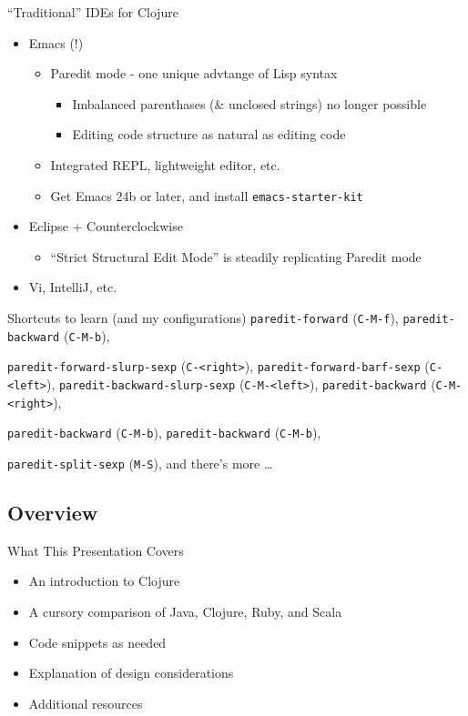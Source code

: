 \documentclass{beamer}
\begin{document}
\begin{frame}[allowframebreaks]{``Traditional'' IDEs for Clojure}
  \begin{itemize}
  \item Emacs (!)
    \begin{itemize}
    \item Paredit mode - one unique advtange of Lisp syntax
      \begin{itemize}
      \item Imbalanced parenthases (\& unclosed strings) no longer possible
      \item Editing code structure as natural as editing code
      \end{itemize}
    \item Integrated REPL, lightweight editor, etc.
    \item Get Emacs 24b or later, and install \texttt{emacs-starter-kit}
    \end{itemize}
  \item Eclipse + Counterclockwise
    \begin{itemize}
    \item ``Strict Structural Edit Mode'' is steadily replicating Paredit mode
    \end{itemize}
  \item Vi, IntelliJ, etc.
  \end{itemize}


\begin{block}{Shortcuts to learn (and my configurations)}
\texttt{paredit-forward} (\texttt{C-M-f}),
\texttt{paredit-backward} (\texttt{C-M-b}),

\texttt{paredit-forward-slurp-sexp} (\texttt{C-<right>}),
\texttt{paredit-forward-barf-sexp} (\texttt{C-<left>}),
\texttt{paredit-backward-slurp-sexp} (\texttt{C-M-<left>}),
\texttt{paredit-backward} (\texttt{C-M-<right>}),

\texttt{paredit-backward} (\texttt{C-M-b}),
\texttt{paredit-backward} (\texttt{C-M-b}),

\texttt{paredit-split-sexp} (\texttt{M-S}),
and there's more \ldots
\end{block}

\end{frame}

\subsection{Overview}

\begin{frame}{What This Presentation Covers}
	\begin{itemize}
	\item An introduction to Clojure
	\item A cursory comparison of Java, Clojure, Ruby, and Scala
	\item Code snippets as needed
	\item Explanation of design considerations
	\item Additional resources
	\end{itemize}
\end{frame}
\end{document}
